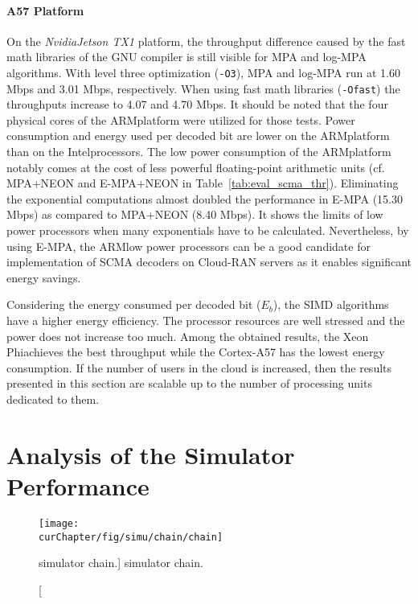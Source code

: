 \paragraph{A57 Platform}

On the \emph{Nvidia\R Jetson TX1} platform, the throughput difference caused by
the fast math libraries of the GNU compiler is still visible for MPA and log-MPA
algorithms. With level three optimization (\verb|-O3|), MPA and log-MPA run at
1.60 Mbps and 3.01 Mbps, respectively. When using fast math libraries
(\verb|-Ofast|) the throughputs increase to 4.07 and 4.70 Mbps. It should be
noted that the four physical cores of the ARM\R platform were  utilized for
those tests. Power consumption and energy used per decoded bit are lower on the
ARM\R platform than on the Intel\R processors. The low power consumption of the
ARM\R platform notably comes at the cost of less powerful floating-point
arithmetic units (cf. MPA+NEON and E-MPA+NEON in Table~\ref{tab:eval_scma_thr}).
Eliminating the exponential computations almost doubled the performance in E-MPA
(15.30 Mbps) as compared to MPA+NEON (8.40 Mbps). It shows the limits of low
power processors when many exponentials have to be calculated. Nevertheless, by
using E-MPA, the ARM\R low power processors can be a good candidate for
implementation of SCMA decoders on Cloud-RAN servers as it enables significant
energy savings.

Considering the energy consumed per decoded bit ($E_b$), the SIMD algorithms
have a higher energy efficiency. The processor resources are well stressed and
the power does not increase too much. Among the obtained results, the Xeon
Phi\TM achieves the best throughput while the Cortex-A57 has the lowest energy
consumption. If the number of users in the cloud is increased, then the results
presented in this section are scalable up to the number of processing units
dedicated to them.

\section{Analysis of the Simulator Performance}
\label{sec:eval_simu}

\begin{figure}[htp]
  \centering
  \texttt{[image: \\curChapter/fig/simu/chain/chain]}
  \caption
    [\AFFECT simulator chain.]
    {\AFFECT simulator chain.}
  \label{fig:simu_chain}
\end{figure}

